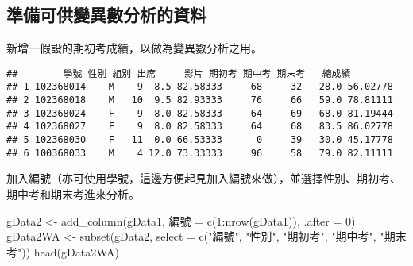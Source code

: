 \documentclass[
]{book}
\newenvironment{Shaded}{\begin{snugshade}}{\end{snugshade}}
\newcommand{\AttributeTok}[1]{\textcolor[rgb]{0.77,0.63,0.00}{#1}}
\newcommand{\DecValTok}[1]{\textcolor[rgb]{0.00,0.00,0.81}{#1}}
\newcommand{\FunctionTok}[1]{\textcolor[rgb]{0.00,0.00,0.00}{#1}}
\newcommand{\NormalTok}[1]{#1}
\newcommand{\OtherTok}[1]{\textcolor[rgb]{0.56,0.35,0.01}{#1}}
\newcommand{\SpecialCharTok}[1]{\textcolor[rgb]{0.00,0.00,0.00}{#1}}
\newcommand{\StringTok}[1]{\textcolor[rgb]{0.31,0.60,0.02}{#1}}
\begin{document}
\hypertarget{ux6e96ux5099ux53efux4f9bux8b8aux7570ux6578ux5206ux6790ux7684ux8cc7ux6599-2}{%
\subsection{準備可供變異數分析的資料}\label{ux6e96ux5099ux53efux4f9bux8b8aux7570ux6578ux5206ux6790ux7684ux8cc7ux6599-2}}

新增一假設的期初考成績，以做為變異數分析之用。

\begin{Shaded}
\end{Shaded}

\begin{verbatim}
##        學號 性別 組別 出席     影片 期初考 期中考 期末考   總成績
## 1 102368014    M    9  8.5 82.58333     68     32   28.0 56.02778
## 2 102368018    M   10  9.5 82.93333     76     66   59.0 78.81111
## 3 102368024    F    9  8.0 82.58333     64     69   68.0 81.19444
## 4 102368027    F    9  8.0 82.58333     64     68   83.5 86.02778
## 5 102368030    F   11  0.0 66.53333      0     39   30.0 45.17778
## 6 100368033    M    4 12.0 73.33333     96     58   79.0 82.11111
\end{verbatim}

加入編號（亦可使用學號，這邊方便起見加入編號來做），並選擇性別、期初考、期中考和期末考進來分析。

\begin{Shaded}
\begin{Highlighting}[]
\NormalTok{gData2 }\OtherTok{\textless{}{-}} \FunctionTok{add\_column}\NormalTok{(gData1, 編號 }\OtherTok{=} \FunctionTok{c}\NormalTok{(}\DecValTok{1}\SpecialCharTok{:}\FunctionTok{nrow}\NormalTok{(gData1)), }\AttributeTok{.after =} \DecValTok{0}\NormalTok{)}
\NormalTok{gData2WA }\OtherTok{\textless{}{-}} \FunctionTok{subset}\NormalTok{(gData2, }\AttributeTok{select =} \FunctionTok{c}\NormalTok{(}\StringTok{"編號"}\NormalTok{, }\StringTok{"性別"}\NormalTok{, }\StringTok{"期初考"}\NormalTok{, }\StringTok{"期中考"}\NormalTok{, }\StringTok{"期末考"}\NormalTok{))}
\FunctionTok{head}\NormalTok{(gData2WA)}
\end{Highlighting}
\end{Shaded}
\end{document}
